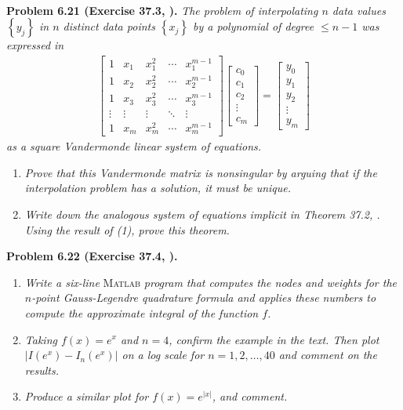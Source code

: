 \documentclass[a4paper,oneside]{book}
\numberwithin{equation}{chapter}
\begin{document}
\\
\textbf{Problem 6.21 (Exercise 37.3, \cite{1}).} \textit{The problem of interpolating $n$ data values $\left\{ {{y_j}} \right\}$ in $n$ distinct data points $\left\{ {{x_j}} \right\}$ by a polynomial of degree $\le n-1$ was expressed in}
\begin{align}
\left[ {\begin{array}{*{20}{c}}
1&{{x_1}}&{x_1^2}& \cdots &{x_1^{m - 1}}\\
1&{{x_2}}&{x_2^2}& \cdots &{x_2^{m - 1}}\\
1&{{x_3}}&{x_3^2}& \cdots &{x_3^{m - 1}}\\
 \vdots & \vdots & \vdots & \ddots & \vdots \\
1&{{x_m}}&{x_m^2}& \cdots &{x_m^{m - 1}}
\end{array}} \right]\left[ {\begin{array}{*{20}{c}}
{{c_0}}\\
{{c_1}}\\
{{c_2}}\\
 \vdots \\
{{c_m}}
\end{array}} \right] = \left[ {\begin{array}{*{20}{c}}
{{y_0}}\\
{{y_1}}\\
{{y_2}}\\
 \vdots \\
{{y_m}}
\end{array}} \right]
\end{align}
\textit{as a square Vandermonde linear system of equations.}
\begin{enumerate}
\item \textit{Prove that this Vandermonde matrix is nonsingular by arguing that if the interpolation problem has a solution, it must be unique.}
\item \textit{Write down the analogous system of equations implicit in Theorem 37.2, \cite{1}. Using the result of (1), prove this theorem.}
\end{enumerate}
\textbf{Problem 6.22 (Exercise 37.4, \cite{1}).}
\begin{enumerate}
\item \textit{Write a six-line}\textsc{ Matlab}\textit{ program that computes the nodes and weights for the $n$-point Gauss-Legendre quadrature formula and applies these numbers to compute the approximate integral of the function $f$.}
\item \textit{Taking $f\left(x\right)=e^x$ and $n=4$, confirm the example in the text. Then plot $\left| {I\left( {{e^x}} \right) - {I_n}\left( {{e^x}} \right)} \right|$ on a log scale for $n=1,2,\ldots,40$ and comment on the results.}
\item \textit{Produce a similar plot for $f\left(x\right)=e^{\left|x\right|}$, and comment.}
\end{enumerate}
\end{document}
